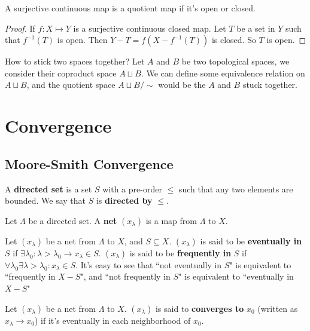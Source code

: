 \documentclass[12pt]{book}
\begin{document}
\begin{theorem}
	A surjective continuous map is a quotient map if it's open or closed.
\end{theorem}
\begin{proof}
	If $f:X\mapsto Y$ is a surjective continuous closed map. Let $T$ be a set in $Y$ such that $f^{-1}(T)$ is open. Then $Y-T=f(X-f^{-1}(T))$ is closed. So $T$ is open.
\end{proof}

\begin{example}
	How to stick two spaces together? Let $A$ and $B$ be two topological spaces, we consider their coproduct space $A\sqcup B$. We can define some equivalence relation on $A\sqcup B$, and the quotient space $A\sqcup B/\sim$ would be the $A$ and $B$ stuck together.
\end{example}

\chapter{Convergence}

\section{Moore-Smith Convergence}

\begin{definition}
	A {\bf directed set} is a set $S$ with a pre-order $\leq$ such that any two elements are bounded. We say that $S$ is {\bf directed by} $\leq$.
\end{definition}

\begin{definition}
	Let $\Lambda$ be a directed set. A {\bf net} $(x_\lambda)$ is a map from $\Lambda$ to $X$.
\end{definition}

\begin{definition}
	Let $(x_\lambda)$ be a net from $\Lambda$ to $X$, and $S\subseteq X$. $(x_\lambda)$ is said to be {\bf eventually in} $S$ if $\exists \lambda_0:\lambda>\lambda_0\rightarrow x_\lambda\in S$. $(x_\lambda)$ is said to be {\bf frequently in} $S$ if $\forall \lambda_0\exists\lambda>\lambda_0: x_\lambda\in S$. It's easy to see that ``not eventually in $S$" is equivalent to ``frequently in $X-S$", and ``not frequently in $S$" is equivalent to ``eventually in $X-S$"
\end{definition}

\begin{definition}
	Let $(x_\lambda)$ be a net from $\Lambda$ to $X$. $(x_\lambda)$ is said to {\bf converges to} $x_0$ (written as $x_\lambda\rightarrow x_0$) if it's eventually in each neighborhood of $x_0$.
\end{definition}
\end{document}
